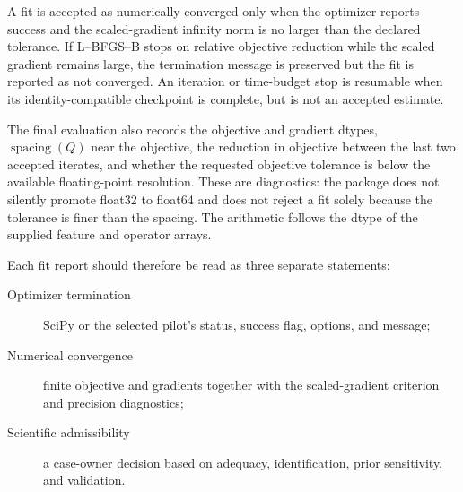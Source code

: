 A fit is accepted as numerically converged only when the optimizer reports
success and the scaled-gradient infinity norm is no larger than the declared
tolerance.  If L--BFGS--B stops on relative objective reduction while the
scaled gradient remains large, the termination message is preserved but the
fit is reported as not converged.  An iteration or time-budget stop is
resumable when its identity-compatible checkpoint is complete, but is not an
accepted estimate.

The final evaluation also records the objective and gradient dtypes,
$\operatorname{spacing}(Q)$ near the objective, the reduction in objective
between the last two accepted iterates, and whether the requested objective
tolerance is below the available floating-point resolution.  These are
diagnostics: the package does not silently promote float32 to float64 and does
not reject a fit solely because the tolerance is finer than the spacing.  The
arithmetic follows the dtype of the supplied feature and operator arrays.

Each fit report should therefore be read as three separate statements:
\begin{description}
  \item[Optimizer termination] SciPy or the selected pilot's status, success
        flag, options, and message;
  \item[Numerical convergence] finite objective and gradients together with
        the scaled-gradient criterion and precision diagnostics;
  \item[Scientific admissibility] a case-owner decision based on adequacy,
        identification, prior sensitivity, and validation.
\end{description}
\endgroup
